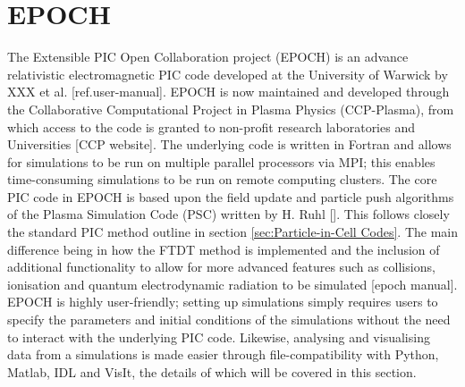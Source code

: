 


\section{EPOCH}
The Extensible PIC Open Collaboration project (EPOCH) is an advance relativistic electromagnetic PIC code developed at the University of Warwick by XXX et al. [ref.user-manual]. EPOCH is now maintained and developed through the Collaborative Computational Project in Plasma Physics (CCP-Plasma), from which access to the code is granted to non-profit research laboratories and Universities [CCP website]. 
The underlying code is written in Fortran and allows for simulations to be run on multiple parallel processors via MPI; this enables time-consuming simulations to be run on remote computing clusters. The core PIC code in EPOCH is based upon the field update and particle push algorithms of the Plasma Simulation Code (PSC) written by H. Ruhl []. This follows closely the standard PIC method outline in section \ref{sec:Particle-in-Cell Codes}. The main difference being in how the FTDT method is implemented and the inclusion of additional functionality to allow for more advanced features such as collisions, ionisation and quantum electrodynamic radiation to be simulated [epoch manual].  \\
\indent EPOCH is highly user-friendly; setting up simulations simply requires users to specify the parameters and initial conditions of the simulations without the need to interact with the underlying PIC code. Likewise, analysing and visualising data from a simulations is made easier through file-compatibility with Python, Matlab, IDL and VisIt, the details of which will be covered in this section.

